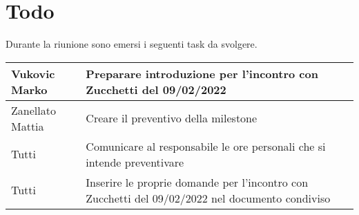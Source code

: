 \section{Todo}
Durante la riunione sono emersi i seguenti task da svolgere.

\begin{center}
  \begin{tabular}{|p{5cm}|p{7cm}|}
    \hline
    Vukovic Marko & Preparare introduzione per l'incontro con Zucchetti del 09/02/2022 \\ \hline
    Zanellato Mattia & Creare il preventivo della milestone \\ \hline
    Tutti & Comunicare al responsabile le ore personali che si intende preventivare \\ \hline
    Tutti & Inserire le proprie domande per l'incontro con Zucchetti del 09/02/2022 nel documento condiviso \\ \hline
  \end{tabular}
\end{center}
